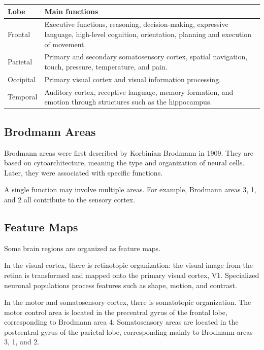 \begin{center}
\begin{tabular}{p{3cm}p{10cm}}
\toprule
\textbf{Lobe} & \textbf{Main functions} \\
\midrule
Frontal & Executive functions, reasoning, decision-making, expressive language, high-level cognition, orientation, planning and execution of movement. \\
Parietal & Primary and secondary somatosensory cortex, spatial navigation, touch, pressure, temperature, and pain. \\
Occipital & Primary visual cortex and visual information processing. \\
Temporal & Auditory cortex, receptive language, memory formation, and emotion through structures such as the hippocampus. \\
\bottomrule
\end{tabular}
\end{center}

\subsection{Brodmann Areas}

Brodmann areas were first described by Korbinian Brodmann in 1909. They are based on cytoarchitecture, meaning the type and organization of neural cells. Later, they were associated with specific functions.

A single function may involve multiple areas. For example, Brodmann areas 3, 1, and 2 all contribute to the sensory cortex.

\subsection{Feature Maps}

Some brain regions are organized as feature maps.

In the visual cortex, there is retinotopic organization: the visual image from the retina is transformed and mapped onto the primary visual cortex, V1. Specialized neuronal populations process features such as shape, motion, and contrast.

In the motor and somatosensory cortex, there is somatotopic organization. The motor control area is located in the precentral gyrus of the frontal lobe, corresponding to Brodmann area 4. Somatosensory areas are located in the postcentral gyrus of the parietal lobe, corresponding mainly to Brodmann areas 3, 1, and 2.

